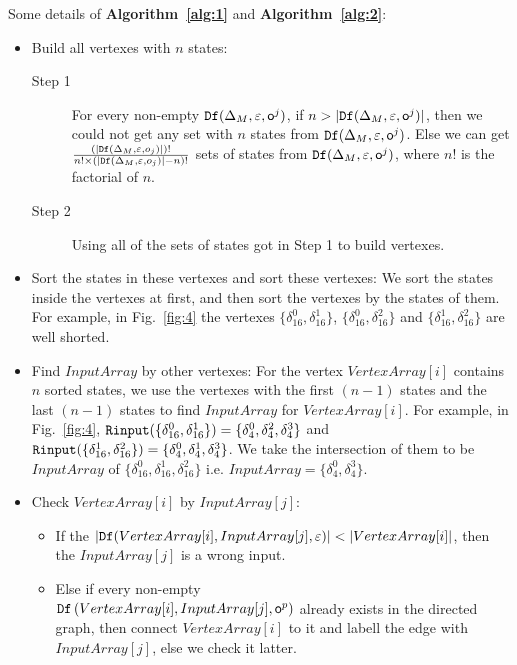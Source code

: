 Some details of {\bf Algorithm~\ref{alg:1}} and {\bf Algorithm~\ref{alg:2}}:
\begin{itemize}
\item Build all vertexes with $n$ states:
\begin{description}
\item[Step 1] For every non-empty ${\tt Df}(\Delta_M,\varepsilon,\mathsf{o}^{j})$, if $n>|{\tt Df}(\Delta_M,\varepsilon,\mathsf{o}^{j})|$, then we could not get any set with $n$ states from ${\tt Df}(\Delta_M,\varepsilon,\mathsf{o}^{j})$. Else we can get $\frac{(|{\tt Df}(\Delta_M,\varepsilon,o_j)|)!}{n!\times (|{\tt Df}(\Delta_M,\varepsilon,o_j)|-n)!}$ sets of states from ${\tt Df}(\Delta_M,\varepsilon,\mathsf{o}^{j})$, where $n!$ is the factorial of $n$.
\item[Step 2] Using all of the sets of states got in Step 1 to build vertexes. 
\end{description}
 \item Sort the states in these vertexes and sort these vertexes: We sort the states inside the vertexes at first, and then sort the vertexes by the states of them. For example, in Fig.~\ref{fig:4} the vertexes $\{\delta_{16}^0,\delta_{16}^1\}$, $\{\delta_{16}^0,\delta_{16}^2\}$ and $\{\delta_{16}^1,\delta_{16}^2\}$ are well shorted. 
  \item Find $InputArray$ by other vertexes:
   For the vertex $VertexArray[i]$ contains $n$ sorted states, we use the vertexes with the first $(n-1)$ states and the last $(n-1)$ states to find $InputArray$ for $VertexArray[i]$. For example, in Fig.~\ref{fig:4}, ${\tt Rinput}(\{\delta_{16}^0,\delta_{16}^1\})=\{\delta_{4}^0,\delta_{4}^2,\delta_{4}^3\}$ and ${\tt Rinput}(\{\delta_{16}^1,\delta_{16}^2\})=\{\delta_{4}^0,\delta_{4}^1,\delta_{4}^3\}$. We take the intersection of them to be $InputArray$ of $\{\delta_{16}^0,\delta_{16}^1,\delta_{16}^2\}$ i.e. $InputArray=\{\delta_{4}^0,\delta_{4}^3\}$. 
  \item Check $VertexArray[i]$ by $InputArray[j]$:
     
\begin{itemize}
\item If the $|\Ded(VertexArray[i],InputArray[j],\varepsilon)|<|VertexArray[i]|$, then the $InputArray[j]$ is a wrong input.
\item Else if every non-empty \\${\tt Df}\left(VertexArray[i],InputArray[j],\mathsf{o}^{p}\right)$ already exists in the directed graph, then connect $VertexArray[i]$ to it and labell the edge with $InputArray[j]$, else we check it latter. 
\end{itemize} 
\end{itemize} 


